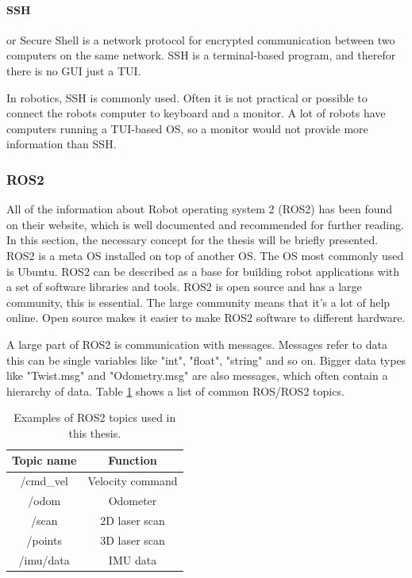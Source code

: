 \paragraph{SSH} or Secure Shell is a network protocol for encrypted communication between two computers on the same network. SSH is a terminal-based program, and therefor there is no GUI just a TUI. 

In robotics, SSH is commonly used. Often it is not practical or possible to connect the robots computer to keyboard and a monitor. A lot of robots have computers running a TUI-based OS, so a monitor would not provide more information than SSH. 

\subsubsection{ROS2} 
 All of the information about Robot operating system 2 (ROS2) has been found on their website\cite{rosfoxydocs}, which is well documented and recommended for further reading. In this section, the necessary concept for the thesis will be briefly presented. 
ROS2 is a meta OS installed on top of another OS. The OS most commonly used is Ubuntu. ROS2 can be described as a base for building robot applications with a set of software libraries and tools. ROS2 is open source and has a large community, this is essential. The large community means that it's a lot of help online. Open source makes it easier to make ROS2 software to different hardware.

A large part of ROS2 is communication with messages. Messages refer to data this can be single variables like "int", "float", "string" and so on. Bigger data types like "Twist.msg" and "Odometry.msg" are also messages, which often contain a hierarchy of data. 
Table \ref{tab:ROS2_topics} shows a list of common ROS/ROS2 topics.
\begin{table}[H]
    \centering
    \caption{Examples of ROS2 topics used in this thesis.}
    \begin{tabular}{c|c}
       Topic name       & Function          \\ \hline
        /cmd\_vel       & Velocity command  \\
        /odom           & Odometer          \\
        /scan           & 2D laser scan     \\
        /points         & 3D laser scan     \\        
        /imu/data       & IMU data          \\
    \end{tabular}
    \label{tab:ROS2_topics}
\end{table}

